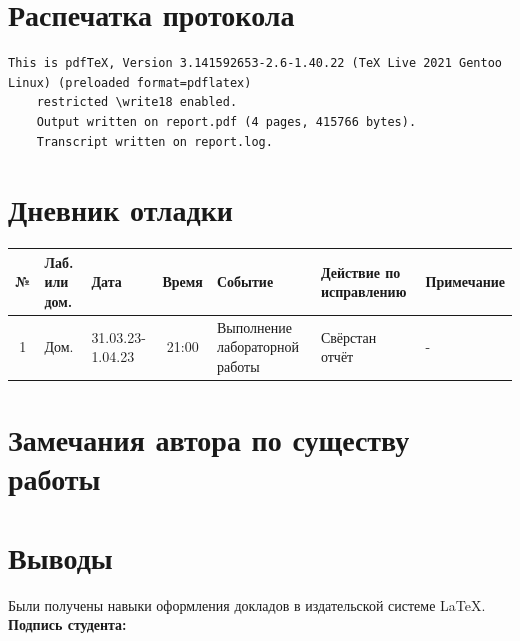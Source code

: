\documentclass[12pt, letterpaper]{article}
\begin{document}
\section{Распечатка протокола}
\begin{lstlisting}[breaklines]
    This is pdfTeX, Version 3.141592653-2.6-1.40.22 (TeX Live 2021 Gentoo Linux) (preloaded format=pdflatex)
    restricted \write18 enabled.
    Output written on report.pdf (4 pages, 415766 bytes).
    Transcript written on report.log.
\end{lstlisting}  
\section{Дневник отладки}
\begin{tabular}{|c|p{1cm}|p{1.5cm}|c|p{2.5cm}|p{2cm}|p{2.25cm}|}
    \hline
    № & Лаб. или дом. & Дата & Время & Событие & Действие по исправлению & Примечание\\
    \hline
    1 & Дом. & 31.03.23-1.04.23 & 21:00 & Выполнение лабораторной работы & Свёрстан отчёт & -\\
    \hline
\end{tabular}
\section{Замечания автора по существу работы}
\begin{itemize}

\end{itemize}
\section{Выводы}
Были получены навыки оформления докладов в издательской системе \LaTeX{}. \\
\flushright \textbf{Подпись студента:} \underline{\hspace{3cm}}
\end{document}
